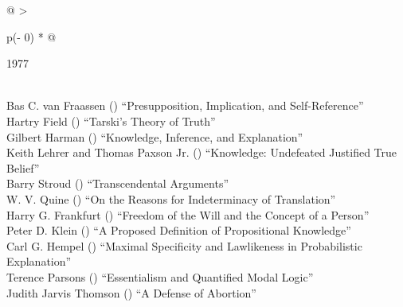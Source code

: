 \documentclass[
  10pt,
  letterpaper,
  DIV=11,
  numbers=noendperiod,
  twoside]{scrartcl}
\begin{document}
\begin{longtable}[]{@{}
  >{\raggedright\arraybackslash}p{(\columnwidth - 0\tabcolsep) * }@{}}

\caption{\label{tbl-top-ten-1968}Most cited articles published less than
ten years ago as of 1977.}

\tabularnewline

\toprule\noalign{}
\begin{minipage}[b]{\linewidth}\raggedright
1977
\end{minipage} \\
\midrule\noalign{}
\endhead
\bottomrule\noalign{}
\endlastfoot
Bas C. van Fraassen
()
``Presupposition, Implication, and Self-Reference'' \\
Hartry Field
()
``Tarski's Theory of Truth'' \\
Gilbert Harman
()
``Knowledge, Inference, and Explanation'' \\
Keith Lehrer and Thomas Paxson Jr.
()
``Knowledge: Undefeated Justified True Belief'' \\
Barry Stroud
()
``Transcendental Arguments'' \\
W. V. Quine
()
``On the Reasons for Indeterminacy of Translation'' \\
Harry G. Frankfurt
()
``Freedom of the Will and the Concept of a Person'' \\
Peter D. Klein
()
``A Proposed Definition of Propositional Knowledge'' \\
Carl G. Hempel
()
``Maximal Specificity and Lawlikeness in Probabilistic Explanation'' \\
Terence Parsons
()
``Essentialism and Quantified Modal Logic'' \\
Judith Jarvis Thomson
()
``A Defense of Abortion'' \\

\end{longtable}
\end{document}
